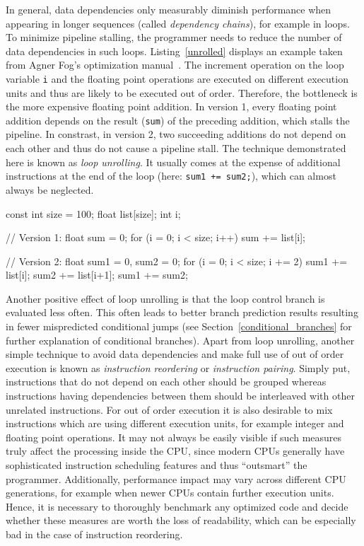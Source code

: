In general, data dependencies only measurably diminish performance when appearing in longer sequences (called \emph{dependency chains}), for example in loops. To minimize pipeline stalling, the programmer needs to reduce the number of data dependencies in such loops. Listing~\ref{unrolled} displays an example taken from Agner Fog's optimization manual~\cite[p. 103]{fog2011optimizing}. The increment operation on the loop variable \texttt{i} and the floating point operations are executed on different execution units and thus are likely to be executed out of order. Therefore, the bottleneck is the more expensive floating point addition. In version 1, every floating point addition depends on the result (\texttt{sum}) of the preceding addition, which stalls the pipeline. In constrast, in version 2, two succeeding additions do not depend on each other and thus do not cause a pipeline stall. The technique demonstrated here is known as \emph{loop unrolling}. It usually comes at the expense of additional instructions at the end of the loop (here: \texttt{sum1 += sum2;}), which can almost always be neglected.
\begin{code}[caption={Loop unrolling example}, label=unrolled]
const int size = 100;
float list[size]; int i;

// Version 1:
float sum = 0;
for (i = 0; i < size; i++) 
  sum += list[i];

// Version 2:
float sum1 = 0, sum2 = 0;
for (i = 0; i < size; i += 2) {
  sum1 += list[i];
  sum2 += list[i+1];
}
sum1 += sum2;
\end{code}


Another positive effect of loop unrolling is that the loop control branch is evaluated less often. This often leads to better branch prediction results resulting in fewer mispredicted conditional jumps (see Section~\ref{conditional_branches} for further explanation of conditional branches). Apart from loop unrolling, another simple technique to avoid data dependencies and make full use of out of order execution is known as \emph{instruction reordering} or \emph{instruction pairing}. Simply put, instructions that do not depend on each other should be grouped whereas instructions having dependencies between them should be interleaved with other unrelated instructions. For out of order execution it is also desirable to mix instructions which are using different execution units, for example integer and floating point operations. It may not always be easily visible if such measures truly affect the processing inside the CPU, since modern CPUs generally have sophisticated instruction scheduling features and thus ``outsmart'' the programmer. Additionally, performance impact may vary across different CPU generations, for example when newer CPUs contain further execution units. Hence, it is necessary to thoroughly benchmark any optimized code and decide whether these measures are worth the loss of readability, which can be especially bad in the case of instruction reordering.

